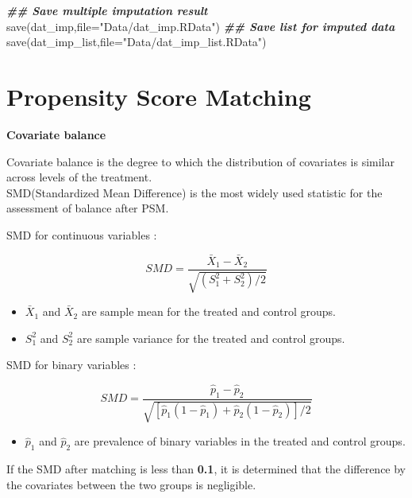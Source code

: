 \documentclass[
]{book}
\newenvironment{Shaded}{\begin{snugshade}}{\end{snugshade}}
\newcommand{\AttributeTok}[1]{\textcolor[rgb]{0.77,0.63,0.00}{#1}}
\newcommand{\DocumentationTok}[1]{\textcolor[rgb]{0.56,0.35,0.01}{\textbf{\textit{#1}}}}
\newcommand{\FunctionTok}[1]{\textcolor[rgb]{0.00,0.00,0.00}{#1}}
\newcommand{\NormalTok}[1]{#1}
\newcommand{\StringTok}[1]{\textcolor[rgb]{0.31,0.60,0.02}{#1}}
\providecommand{\tightlist}{%
  \setlength{\itemsep}{0pt}\setlength{\parskip}{0pt}}
\theoremstyle{definition}
\theoremstyle{definition}
\theoremstyle{definition}
\theoremstyle{definition}
\theoremstyle{remark}
\begin{document}
\begin{Shaded}
\begin{Highlighting}[]
\DocumentationTok{\#\# Save multiple imputation result}
\FunctionTok{save}\NormalTok{(dat\_imp,}\AttributeTok{file=}\StringTok{"Data/dat\_imp.RData"}\NormalTok{)}
\DocumentationTok{\#\# Save list for imputed data}
\FunctionTok{save}\NormalTok{(dat\_imp\_list,}\AttributeTok{file=}\StringTok{"Data/dat\_imp\_list.RData"}\NormalTok{)}
\end{Highlighting}
\end{Shaded}

\hypertarget{propensity-score-matching}{%
\chapter{Propensity Score Matching}\label{propensity-score-matching}}

\textbf{Covariate balance}

Covariate balance is the degree to which the distribution of covariates is similar across levels of the treatment.\\
SMD(Standardized Mean Difference) is the most widely used statistic for the assessment of balance after PSM.

SMD for continuous variables :

\[SMD=\frac{\bar X_1-\bar X_2}{\sqrt{(S^2_1+S^2_2)/2}}\]

\begin{itemize}
\tightlist
\item
  \(\bar X_1\) and \(\bar X_2\) are sample mean for the treated and control groups.\\
\item
  \(S^2_1\) and \(S^2_2\) are sample variance for the treated and control groups.
\end{itemize}

SMD for binary variables :

\[SMD=\frac{\hat p_1-\hat p_2}{\sqrt{[\hat p_1(1-\hat p_1)+\hat p_2(1-\hat p_2)]/2}}\]

\begin{itemize}
\tightlist
\item
  \(\hat p_1\) and \(\hat p_2\) are prevalence of binary variables in the treated and control groups.
\end{itemize}

If the SMD after matching is less than \textbf{0.1}, it is determined that the difference by the covariates between the two groups is negligible.
\end{document}
